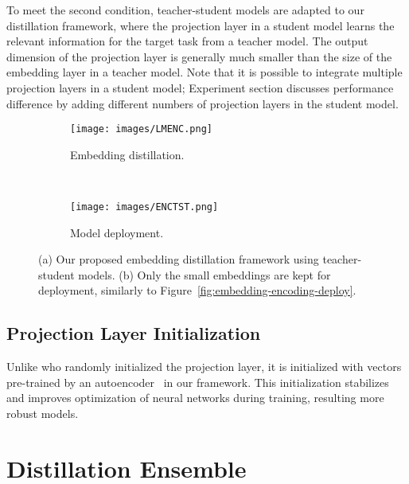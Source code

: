 \documentclass{article}
\begin{document}
To meet the second condition, teacher-student models are adapted to our distillation framework, where the projection layer in a student model learns the relevant information for the target task from a teacher model.
The output dimension of the projection layer is generally much smaller than the size of the embedding layer in a teacher model.
Note that it is possible to integrate multiple projection layers in a student model; Experiment section discusses performance difference by adding different numbers of projection layers in the student model.

\begin{figure}[htbp!]
    \centering
   	\begin{subfigure}[b]{0.23\textwidth}
   		\centering
\texttt{[image: images/LMENC.png]}
   		\caption{Embedding distillation.}
   		\label{fig:embedding-distill}
   	\end{subfigure}~ 
   	\begin{subfigure}[b]{0.23\textwidth}
   		\centering
\texttt{[image: images/ENCTST.png]}
   		\caption{Model deployment.}
   		\label{fig:embedding-deploy}
   	\end{subfigure}\caption{(a) Our proposed embedding distillation framework using teacher-student models.
             (b) Only the small embeddings are kept for deployment, similarly to Figure~\ref{fig:embedding-encoding-deploy}.}
         	\vspace{-2ex}
	\label{fig:lm}
\end{figure}


\subsection{Projection Layer Initialization}
\label{ssec:encoding}

Unlike \cite{mou2016distilling} who randomly initialized the projection layer, it is initialized with vectors pre-trained by an autoencoder~\cite{hinton1994autoencoders} in our framework.
This initialization stabilizes and improves optimization of neural networks during training, resulting more robust models.








 \section{Distillation Ensemble}
\label{sec:ensemble}
\end{document}
